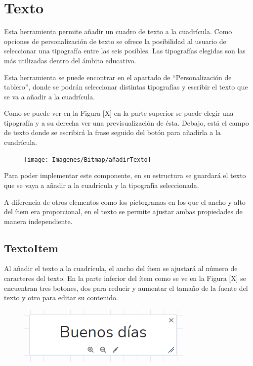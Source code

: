 \section{Texto}

Esta herramienta permite añadir un cuadro de texto a la cuadrícula. Como opciones de personalización de texto se ofrece la posibilidad al usuario de seleccionar una tipografía entre las seis posibles. Las tipografías elegidas son las más utilizadas dentro del ámbito educativo.

Esta herramienta se puede encontrar en el apartado de “Personalización de tablero”, donde se podrán seleccionar distintas tipografías y escribir el texto que se va a añadir a la cuadrícula.

Como se puede ver en la Figura [X] en la parte superior se puede elegir una tipografía y a su derecha ver una previsualización de ésta. Debajo, está el campo de texto donde se escribirá la frase seguido del botón para añadirla a la cuadrícula.

\begin{figure}[h!]
	\centering
	\texttt{[image: Imagenes/Bitmap/añadirTexto]}
	\caption{}
	\label{fig:anadirtexto}
\end{figure}


Para poder implementar este componente, en su estructura se guardará el texto que se vaya a añadir a la cuadrícula y la tipografía seleccionada.

A diferencia de otros elementos como los pictogramas en los que el ancho y alto del ítem era proporcional, en el texto se permite ajustar ambas propiedades de manera independiente.

\subsection{TextoItem}

Al añadir el texto a la cuadrícula, el ancho del ítem se ajustará al número de caracteres del texto. En la parte inferior del ítem como se ve en la Figura [X] se encuentran tres botones, dos para reducir y aumentar el tamaño de la fuente del texto y otro para editar su contenido.

\begin{figure}[h!]
	\centering
	\includegraphics[width=0.7\linewidth]{Imagenes/Bitmap/fraseItem1}
	\caption{}
	\label{fig:fraseitem1}
\end{figure}


